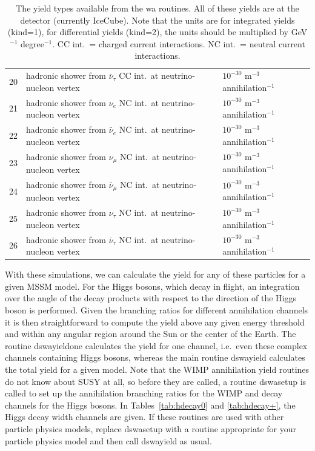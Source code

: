\documentclass[a4paper,10pt,oneside]{book}
\newcommand{\code}[1]{\ft{#1}}
\newcommand{\ft}[1]{\textsf{#1}}
\begin{document}
\begin{table}
\begin{tabular}{lll}
20 & hadronic shower from $\bar{\nu}_\tau$ CC int.\ at neutrino-nucleon vertex & $10^{-30}$ m$^{-3}$ annihilation$^{-1}$ \\
21 & hadronic shower from $\nu_e$ NC int.\ at neutrino-nucleon vertex & $10^{-30}$ m$^{-3}$ annihilation$^{-1}$ \\
22 & hadronic shower from $\bar{\nu}_e$ NC int.\ at neutrino-nucleon vertex & $10^{-30}$ m$^{-3}$ annihilation$^{-1}$ \\
23 & hadronic shower from $\nu_\mu$ NC int.\ at neutrino-nucleon vertex & $10^{-30}$ m$^{-3}$ annihilation$^{-1}$ \\
24 & hadronic shower from $\bar{\nu}_\mu$ NC int.\ at neutrino-nucleon vertex & $10^{-30}$ m$^{-3}$ annihilation$^{-1}$ \\
25 & hadronic shower from $\nu_\tau$ NC int.\ at neutrino-nucleon vertex & $10^{-30}$ m$^{-3}$ annihilation$^{-1}$ \\
26 & hadronic shower from $\bar{\nu}_\tau$ NC int.\ at neutrino-nucleon vertex & $10^{-30}$ m$^{-3}$ annihilation$^{-1}$ \\
\end{tabular}
\caption{The yield types available from the \code{wa} routines. All of these yields are at the detector (currently IceCube). Note that the units are for integrated yields (\code{kind}=1), for differential
yields (\code{kind}=2), the units should be multiplied by GeV$^{-1}$ degree$^{-1}$.
CC int.\ = charged current interactions. NC int.\ = neutral current interactions.
\label{tab:wa-types}}
\end{table}

With these simulations, we can calculate the yield for any of these
particles for a given MSSM model.  For the Higgs bosons, which decay
in flight, an integration over the angle of the decay products with
respect to the direction of the Higgs boson is performed.  Given the
branching ratios for different annihilation channels it is then
straightforward to compute the yield above any given energy
threshold and within any angular region around the Sun or the center
of the Earth. The routine \code{dswayieldone} calculates the yield for one channel, i.e.\ even these complex channels containing Higgs bosons, whereas the main routine \code{dswayield} calculates the total
yield for a given model. Note that the WIMP annihilation yield routines do not know about SUSY at all, so before they are called, a routine \code{dswasetup} is called to set up the annihilation branching ratios for the WIMP and decay channels for the Higgs bosons. In Tables~\ref{tab:hdecay0} and \ref{tab:hdecay+}, the Higgs decay width channels are given.
 If these routines are used with other particle physics models, replace \code{dswasetup} with a routine appropriate for your particle physics model and then call \code{dswayield} as usual.
\end{document}
